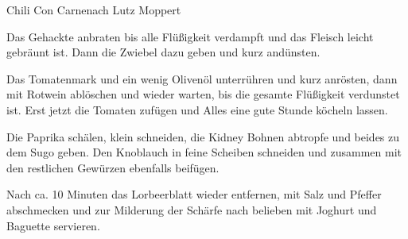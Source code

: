 \begin{recipe}{Chili Con Carne}{nach Lutz Moppert}
  \inglist

  \steps
  Das Gehackte anbraten bis alle Flüßigkeit verdampft und das Fleisch leicht gebräunt ist.
  Dann die Zwiebel dazu geben und kurz andünsten.

  Das Tomatenmark und ein wenig Olivenöl unterrühren und kurz anrösten, dann mit Rotwein
  ablöschen und wieder warten, bis die gesamte Flüßigkeit verdunstet ist. Erst jetzt die
  Tomaten zufügen und Alles eine gute Stunde köcheln lassen.

  Die Paprika schälen, klein schneiden, die Kidney Bohnen abtropfe und beides zu dem Sugo
  geben. Den Knoblauch in feine Scheiben schneiden und zusammen mit den restlichen
  Gewürzen ebenfalls beifügen.

  Nach ca. 10 Minuten das Lorbeerblatt wieder entfernen, mit Salz und Pfeffer abschmecken
  und zur Milderung der Schärfe nach belieben mit Joghurt und Baguette servieren.
\end{recipe}
